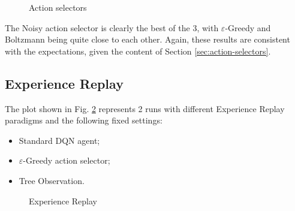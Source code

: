 \documentclass[a4paper, 12pt]{article}
\numberwithin{equation}{section}
\begin{document}
\begin{figure}[H]
	\centering
		\caption{Action selectors}
	\label{fig:plot-action-selectors}
\end{figure}

The Noisy action selector is clearly the best of the 3, with $\varepsilon$-Greedy and Boltzmann being quite close to each other. Again, these results are consistent with the expectations, given the content of Section \ref{sec:action-selectors}.

\clearpage
\subsection{Experience Replay}

The plot shown in Fig. \ref{fig:plot-experience-replay} represents 2 runs with different Experience Replay paradigms and the following fixed settings:
\begin{itemize}
	\item Standard DQN agent;
	\item $\varepsilon$-Greedy action selector;
	\item Tree Observation.
\end{itemize}

\begin{figure}[H]
	\centering
		\caption{Experience Replay}
	\label{fig:plot-experience-replay}
\end{figure}
\end{document}
